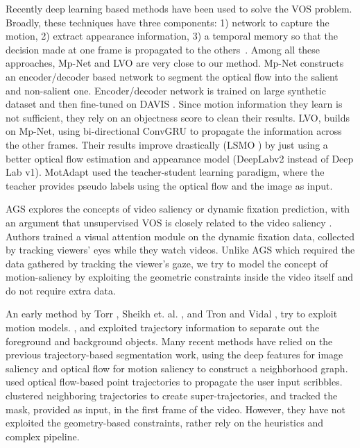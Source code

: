 \documentclass[10pt,twocolumn,letterpaper]{article}
\begin{document}
Recently deep learning based methods have been used to solve the VOS problem. 
Broadly, these techniques have three components: 1) network to capture the motion, 2) extract appearance information, 3) a temporal memory so that the decision made at one frame is propagated to the others~\cite{visMem, fusionseg, SegFlow, PDB}.
Among all these approaches, Mp-Net \cite{MpNet} and LVO \cite{visMem} are very close to our method. Mp-Net constructs an encoder/decoder based network to segment the optical flow into the salient and non-salient one. 
Encoder/decoder network is trained on large synthetic dataset \cite{F3DT} and then fine-tuned on DAVIS \cite{DAVIS2016}.
Since motion information they learn is not sufficient, they rely on an objectness score \cite{objectness} to clean their results. 
LVO, builds on Mp-Net, using bi-directional ConvGRU to propagate the information across the other frames. Their results improve drastically (LSMO \cite{lsmo}) by just using a better optical flow estimation and appearance model (DeepLabv2 instead of Deep Lab v1). 
MotAdapt \cite{MotAdapt} used the teacher-student learning paradigm, where the teacher provides pseudo labels using the optical flow and the image as input.  

AGS \cite{ags} explores the concepts of video saliency or dynamic fixation prediction, with an argument that unsupervised VOS is closely related to the video saliency \cite{wang2018revisiting}. Authors trained a visual attention module on the dynamic fixation data, collected by tracking viewers' eyes while they watch videos. 
Unlike AGS which required the data gathered by tracking the viewer's gaze, we try to model the concept of motion-saliency by exploiting the geometric constraints inside the video itself and do not require extra data.  

An early method by Torr \cite{torr1998geometric}, Sheikh et. al. \cite{sheikh2009background}, and Tron and Vidal \cite{tron2007benchmark}, try to exploit motion models. \cite{sheikh2009background}, and \cite{tron2007benchmark} exploited trajectory information to separate out the foreground and background objects. 
Many recent methods \cite{ARP,cliqu2018, STP} have relied on the previous trajectory-based segmentation work, using the deep features for image saliency and optical flow for motion saliency to construct a neighborhood graph. \cite{shankar2015video} used optical flow-based point trajectories to propagate the user input scribbles. \cite{wang2017super} clustered neighboring trajectories to create super-trajectories, and tracked the mask, provided as input, in the first frame of the video. However, they have not exploited the geometry-based constraints, rather rely on the heuristics and complex pipeline.
\end{document}
